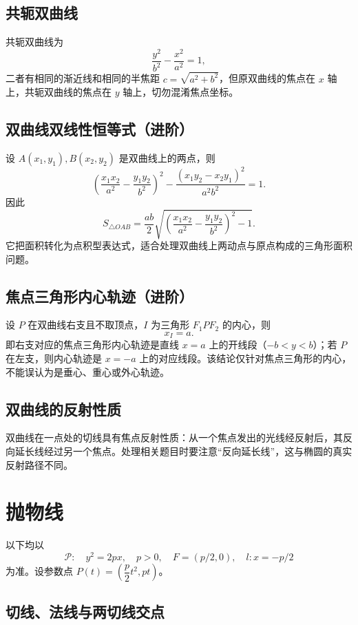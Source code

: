 \documentclass[UTF8,zihao=-4,a4paper]{ctexart}
\begin{document}
\subsection{共轭双曲线}

共轭双曲线为
\[
\boxed{\frac{y^2}{b^2}-\frac{x^2}{a^2}=1},
\]
二者有相同的渐近线和相同的半焦距 $c=\sqrt{a^2+b^2}$，但原双曲线的焦点在 $x$ 轴上，共轭双曲线的焦点在 $y$ 轴上，切勿混淆焦点坐标。

\subsection{双曲线双线性恒等式（进阶）}
设 $A(x_1,y_1),B(x_2,y_2)$ 是双曲线上的两点，则
\[
\boxed{\left(\frac{x_1x_2}{a^2}-\frac{y_1y_2}{b^2}\right)^2
-\frac{(x_1y_2-x_2y_1)^2}{a^2b^2}=1}.
\]
因此
\[
\boxed{S_{\triangle OAB}=\frac{ab}{2}
\sqrt{\left(\frac{x_1x_2}{a^2}-\frac{y_1y_2}{b^2}\right)^2-1}}.
\]
它把面积转化为点积型表达式，适合处理双曲线上两动点与原点构成的三角形面积问题。

\subsection{焦点三角形内心轨迹（进阶）}

设 $P$ 在双曲线右支且不取顶点，$I$ 为三角形 $F_1PF_2$ 的内心，则
\[
\boxed{x_I=a}.
\]
即右支对应的焦点三角形内心轨迹是直线 $x=a$ 上的开线段（$-b<y<b$）；若 $P$ 在左支，则内心轨迹是 $x=-a$ 上的对应线段。该结论仅针对焦点三角形的内心，不能误认为是垂心、重心或外心轨迹。

\subsection{双曲线的反射性质}

双曲线在一点处的切线具有焦点反射性质：从一个焦点发出的光线经反射后，其反向延长线经过另一个焦点。处理相关题目时要注意“反向延长线”，这与椭圆的真实反射路径不同。

\section{抛物线}

以下均以
\[
\mathcal P:\quad y^2=2px,\quad p>0,\quad F=(p/2,0),\quad l:x=-p/2
\]
为准。设参数点 $P(t)=\left(\dfrac p2t^2,pt\right)$。

\subsection{切线、法线与两切线交点}
\end{document}
